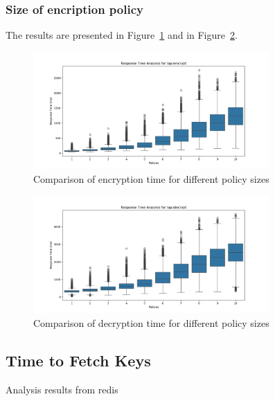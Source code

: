 \documentclass[cic,tc,english]{iiufrgs}
\begin{document}
            \subsubsection{Size of encription policy}
                The results are presented in Figure~\ref{fig:encrypt_policy_size} and in Figure~\ref{fig:decrypt_policy_size}.


                \begin{figure}
                    \centering
                    \includegraphics[width=0.8\textwidth]{images/phase4/response_time_api_encrypt.png}
                    \caption{Comparison of encryption time for different policy sizes}
                    \label{fig:encrypt_policy_size}
                \end{figure}

                \begin{figure}
                    \centering
                    \includegraphics[width=0.8\textwidth]{images/phase4/response_time_api_decrypt.png}
                    \caption{Comparison of decryption time for different policy sizes}
                    \label{fig:decrypt_policy_size}
                \end{figure}

        \subsection{Time to Fetch Keys}
            \label{sec:timefetchkeys}
            Analysis results from redis
\end{document}
